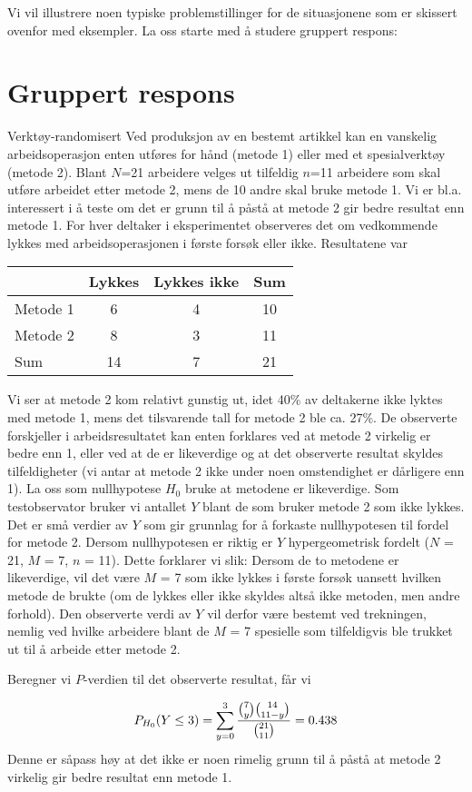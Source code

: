 Vi vil illustrere noen typiske problemstillinger for de situasjonene
som er skissert ovenfor med eksempler.  La oss starte med å 
studere gruppert respons:


\section{Gruppert respons}
\begin{eksempel}{Verktøy-randomisert}
Ved produksjon av en bestemt artikkel kan en vanskelig arbeidsoperasjon
enten utføres for hånd (metode 1) eller med et spesialverktøy
(metode 2).  Blant $N$=21 arbeidere velges ut tilfeldig $n$=11 arbeidere
som skal utføre arbeidet etter metode 2, mens de 10 andre skal
bruke metode 1.  Vi er bl.a. interessert i å teste om det er grunn
til å påstå at metode 2 gir bedre resultat enn metode 1.  
For hver deltaker i eksperimentet observeres det om vedkommende lykkes
med arbeidsoperasjonen i første forsøk eller ikke.  Resultatene
var
\begin{center}
\begin{tabular}{l|cc|c} 
           &    Lykkes   &   Lykkes ikke    &    Sum \\ \hline
Metode 1   &      6      &        4         &     10  \\
Metode 2   &      8      &        3         &     11 \\ \hline
Sum        &     14      &        7         &     21 \\ \hline
\end{tabular}
\end{center}
Vi ser at metode 2 kom relativt gunstig ut, idet 40\% av deltakerne
ikke lyktes med metode 1, mens det tilsvarende tall for metode 2 ble
ca. 27\%.  De observerte forskjeller i arbeidsresultatet kan enten
forklares ved at metode 2 virkelig er bedre enn 1, eller ved at de er
likeverdige og at det observerte resultat skyldes tilfeldigheter
(vi antar at metode 2 ikke under noen om\-sten\-dighet er dårligere
enn 1).  La oss som nullhypotese $H_0$ bruke at metodene er
likeverdige.  Som testobservator bruker vi antallet $Y$ blant de som
bruker metode 2 som ikke lykkes.  Det er små verdier av $Y$ som
gir grunnlag for å forkaste nullhypotesen til fordel for metode 2.
Dersom nullhypotesen er riktig er $Y$ hypergeometrisk fordelt
($N$ = 21, $M$ = 7, $n$ = 11).  Dette forklarer vi slik:  Dersom de to 
metodene er likeverdige, vil det være $M$ = 7 som ikke lykkes i
første forsøk uansett hvilken metode de brukte (om de lykkes
eller ikke skyldes altså ikke metoden, men andre forhold).  Den
observerte verdi av $Y$ vil derfor være bestemt ved trekningen,
nemlig ved hvilke arbeidere blant de $M$ = 7 spesielle som 
tilfeldigvis ble trukket ut til å arbeide etter metode 2.

Beregner vi $P$-verdien til det observerte resultat, får vi 

\[ P_{H_0}(Y\leq 3)=\sum_{y=0}^3 \frac{{{7}\choose{y}} {{14}\choose{11-y}}}
                                 {{{21}\choose{11}}}=0.438 \]
Denne er såpass høy at det ikke er noen rimelig grunn til å
påstå at metode 2 virkelig gir bedre resultat enn metode 1.
\end{eksempel}

